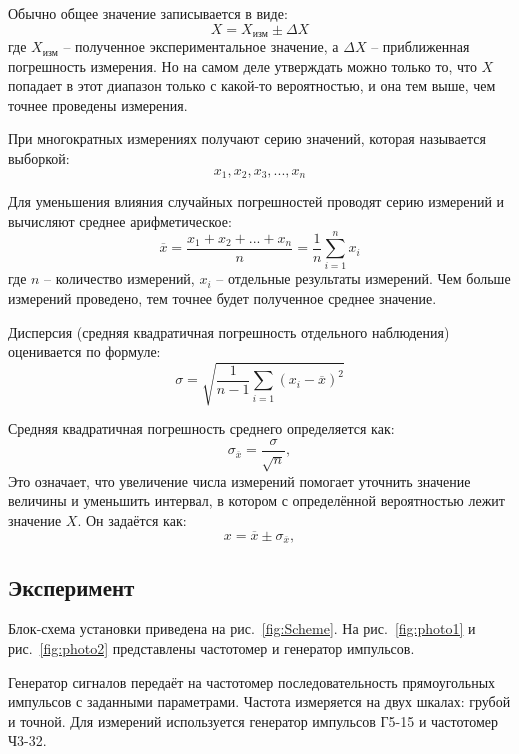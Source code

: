 Обычно общее значение записывается в виде:
\begin{equation}
    X=X_{изм}\pm \Delta X
\end{equation}
где $X_{изм}$ -- полученное экспериментальное значение, а $\Delta X$ -- приближенная погрешность измерения. Но на самом деле утверждать можно только то, что $X$ попадает в этот диапазон только с какой-то вероятностью, и она тем выше, чем точнее проведены измерения.

При многократных измерениях получают серию значений, которая называется выборкой:
\begin{equation}
    x_1,x_2,x_3, ..., x_n
\end{equation}

Для уменьшения влияния случайных погрешностей проводят серию измерений и вычисляют среднее арифметическое:
\begin{equation}
    \overline{x}=\frac{x_1+x_2+...+x_n}{n}=\frac{1}{n}\sum_{i=1}^{n} x_i
\end{equation}
где $n$ -- количество измерений, $x_i$ -- отдельные результаты измерений. Чем больше измерений проведено, тем точнее будет полученное среднее значение.

Дисперсия (средняя квадратичная погрешность отдельного наблюдения) оценивается по формуле:
\begin{equation}
\label{eq:3}
    \sigma=\sqrt{\frac{1}{n-1}\sum_{i=1} (x_i-\overline{x})^2}
\end{equation}

Средняя квадратичная погрешность среднего определяется как:
\begin{equation}
\label{eq:4}
    \sigma_{\overline{x}}=\frac{\sigma}{\sqrt{n}} ,
\end{equation}
Это означает, что увеличение числа измерений помогает уточнить значение величины и уменьшить интервал, в котором с определённой вероятностью лежит значение $X$. Он задаётся как:
\begin{equation}
    x=\overline{x}\pm\sigma_{\overline{x}} ,
\end{equation}

\subsection{Эксперимент}
Блок-схема установки приведена на рис.~\ref{fig:Scheme}. На рис.~\ref{fig:photo1} и рис.~\ref{fig:photo2} представлены частотомер и генератор импульсов.

Генератор сигналов передаёт на частотомер последовательность прямоугольных импульсов с заданными параметрами. Частота измеряется на двух шкалах: грубой и точной. Для измерений используется генератор импульсов Г5-15 и частотомер Ч3-32.

